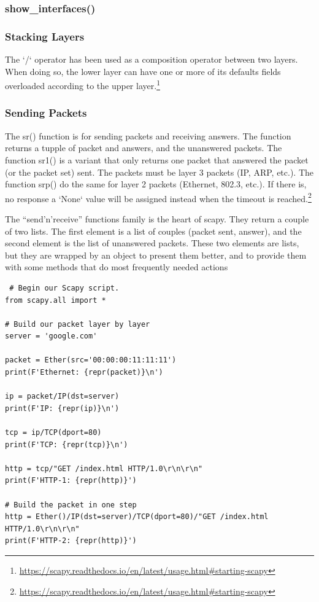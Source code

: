 \documentclass[11pt,a4paper]{article}
\begin{document}
\subsubsection{show\_interfaces()}


\subsubsection{Stacking Layers}
The `/` operator has been used as a composition operator between two layers. When doing so, the lower layer can have one or more of its defaults fields overloaded according to the upper layer.\footnote{\url{https://scapy.readthedocs.io/en/latest/usage.html\#starting-scapy}}

 \subsubsection{Sending Packets}
 The sr() function is for sending packets and receiving answers. The function returns a tupple of packet and answers, and the unanswered packets. The function sr1() is a variant that only returns one packet that answered the packet (or the packet set) sent. The packets must be layer 3 packets (IP, ARP, etc.). The function srp() do the same for layer 2 packets (Ethernet, 802.3, etc.). If there is, no response a `None` value will be assigned instead when the timeout is reached.\footnote{\url{https://scapy.readthedocs.io/en/latest/usage.html\#starting-scapy}}

 The ``send'n'receive'' functions family is the heart of scapy. They return a couple of two lists. The first element is a list of couples (packet sent, answer), and the second element is the list of unanswered packets. These two elements are lists, but they are wrapped by an object to present them better, and to provide them with some methods that do most frequently needed actions

 \begin{verbatim}
 # Begin our Scapy script.
from scapy.all import *

# Build our packet layer by layer
server = 'google.com'

packet = Ether(src='00:00:00:11:11:11')
print(F'Ethernet: {repr(packet)}\n')

ip = packet/IP(dst=server)
print(F'IP: {repr(ip)}\n')

tcp = ip/TCP(dport=80)
print(F'TCP: {repr(tcp)}\n')

http = tcp/"GET /index.html HTTP/1.0\r\n\r\n"
print(F'HTTP-1: {repr(http)}')

# Build the packet in one step
http = Ether()/IP(dst=server)/TCP(dport=80)/"GET /index.html HTTP/1.0\r\n\r\n"
print(F'HTTP-2: {repr(http)}')
\end{verbatim}
\end{document}
